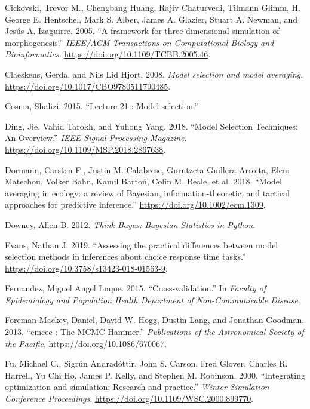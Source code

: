 \documentclass[]{article}
\begin{document}
\leavevmode\hypertarget{ref-Cickovski2005}{}%
Cickovski, Trevor M., Chengbang Huang, Rajiv Chaturvedi, Tilmann Glimm,
H. George E. Hentschel, Mark S. Alber, James A. Glazier, Stuart A.
Newman, and Jesús A. Izaguirre. 2005. ``A framework for
three-dimensional simulation of morphogenesis.'' \emph{IEEE/ACM
Transactions on Computational Biology and Bioinformatics}.
\url{https://doi.org/10.1109/TCBB.2005.46}.

\leavevmode\hypertarget{ref-Claeskens2008}{}%
Claeskens, Gerda, and Nils Lid Hjort. 2008. \emph{Model selection and
model averaging}. \url{https://doi.org/10.1017/CBO9780511790485}.

\leavevmode\hypertarget{ref-Cosma2015}{}%
Cosma, Shalizi. 2015. ``Lecture 21 : Model selection.''

\leavevmode\hypertarget{ref-Ding2018}{}%
Ding, Jie, Vahid Tarokh, and Yuhong Yang. 2018. ``Model Selection
Techniques: An Overview.'' \emph{IEEE Signal Processing Magazine}.
\url{https://doi.org/10.1109/MSP.2018.2867638}.

\leavevmode\hypertarget{ref-Dormann2018}{}%
Dormann, Carsten F., Justin M. Calabrese, Gurutzeta Guillera-Arroita,
Eleni Matechou, Volker Bahn, Kamil Bartoń, Colin M. Beale, et al. 2018.
``Model averaging in ecology: a review of Bayesian,
information-theoretic, and tactical approaches for predictive
inference.'' \url{https://doi.org/10.1002/ecm.1309}.

\leavevmode\hypertarget{ref-Downey2012}{}%
Downey, Allen B. 2012. \emph{Think Bayes: Bayesian Statistics in
Python}.

\leavevmode\hypertarget{ref-Evans2019}{}%
Evans, Nathan J. 2019. ``Assessing the practical differences between
model selection methods in inferences about choice response time
tasks.'' \url{https://doi.org/10.3758/s13423-018-01563-9}.

\leavevmode\hypertarget{ref-Fernandez2015}{}%
Fernandez, Miguel Angel Luque. 2015. ``Cross-validation.'' In
\emph{Faculty of Epidemiology and Population Health Department of
Non-Communicable Disease.}

\leavevmode\hypertarget{ref-Foreman-Mackey2013}{}%
Foreman-Mackey, Daniel, David W. Hogg, Dustin Lang, and Jonathan
Goodman. 2013. ``emcee : The MCMC Hammer.'' \emph{Publications of the
Astronomical Society of the Pacific}.
\url{https://doi.org/10.1086/670067}.

\leavevmode\hypertarget{ref-Fu2000}{}%
Fu, Michael C., Sigrún Andradóttir, John S. Carson, Fred Glover, Charles
R. Harrell, Yu Chi Ho, James P. Kelly, and Stephen M. Robinson. 2000.
``Integrating optimization and simulation: Research and practice.''
\emph{Winter Simulation Conference Proceedings}.
\url{https://doi.org/10.1109/WSC.2000.899770}.
\end{document}
